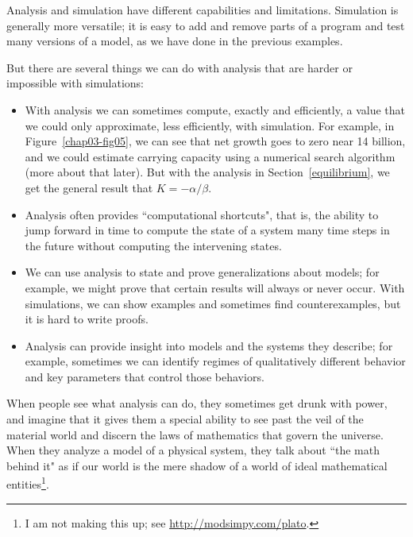 \documentclass[12pt]{book}
\theoremstyle{exercise}
\begin{document}

Analysis and simulation have different capabilities and limitations.  Simulation is generally more versatile; it is easy to add and remove parts of a program and test many versions of a model, as we have done in the previous examples.

But there are several things we can do with analysis that are harder or impossible with simulations:

\begin{itemize}

\item With analysis we can sometimes compute, exactly and efficiently, a value that we could only approximate, less efficiently, with simulation.  For example, in Figure~\ref{chap03-fig05}, we can see that net growth goes to zero near 14 billion, and we could estimate carrying capacity using a numerical search algorithm (more about that later).  But with the analysis in Section~\ref{equilibrium}, we get the general result that $K=-\alpha/\beta$.

\item Analysis often provides ``computational shortcuts", that is, the ability to jump forward in time to compute the state of a system many time steps in the future without computing the intervening states.


\item We can use analysis to state and prove generalizations about models; for example, we might prove that certain results will always or never occur.  With simulations, we can show examples and sometimes find counterexamples, but it is hard to write proofs.


\item Analysis can provide insight into models and the systems they describe; for example, sometimes we can identify regimes of qualitatively different behavior and key parameters that control those behaviors.


\end{itemize}

When people see what analysis can do, they sometimes get drunk with power, and imagine that it gives them a special ability to see past the veil of the material world and discern the laws of mathematics that govern the universe.  When they analyze a model of a physical system, they talk about ``the math behind it" as if our world is the mere shadow of a world of ideal mathematical entities\footnote{I am not making this up; see \url{http://modsimpy.com/plato}.}.
\end{document}
